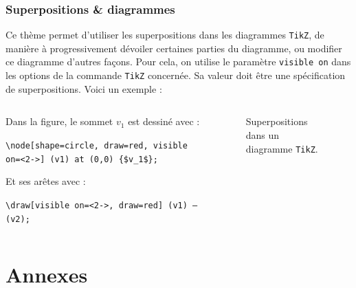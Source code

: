 \documentclass[10pt,    %
    french,             %
    xcolor=table,       %
    envcountsect,       %
    aspectratio=43      %
]{beamer}
\begin{document}
\begin{frame}
    \label{sli:Diagrammes}
    \frametitle{Superpositions \& diagrammes}
    Ce thème permet d'utiliser les superpositions dans les diagrammes \texttt{TikZ}, de manière à progressivement dévoiler certaines parties du diagramme, ou modifier ce diagramme d'autres façons. Pour cela, on utilise le paramètre \texttt{visible on} dans les options de la commande \texttt{TikZ} concernée. Sa valeur doit être une spécification de superpositions. Voici un exemple :
    
    \begin{columns}[totalwidth=\textwidth]
        \begin{column}{0.49\textwidth}
            Dans la figure, le sommet $v_1$ est dessiné avec :

            \texttt{\textbackslash{}node[shape=circle, draw=red, \alert{visible on=<2->}] (v1) at (0,0) \{\$v\_1\$\};}
            
            \vspace{0.25cm}
            Et ses arêtes avec :
	        
	        \texttt{\textbackslash{}draw[\alert{visible on=<2->}, draw=red] (v1) -- (v2);}
        \end{column}
        \begin{column}{0.49\textwidth}
            \begin{figure}[H]
                \centering
                \resizebox{0.6\linewidth}{!}{}
                \caption{Superpositions dans un diagramme \texttt{TikZ}.}
                \label{fig:overlays}
            \end{figure}
        \end{column}
    \end{columns}
\end{frame}












\appendix
\section{Annexes}
\sectionframe
\end{document}
